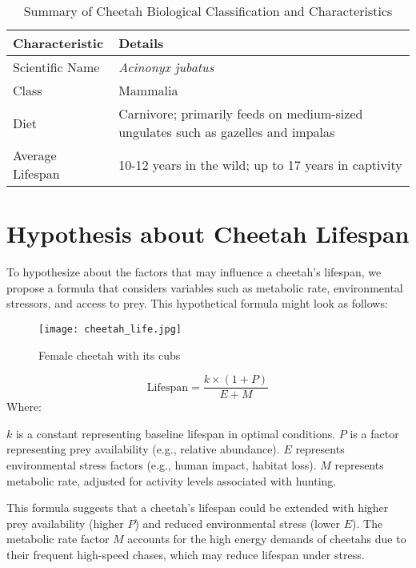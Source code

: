 \documentclass{article}
\begin{document}
\begin{table}[H]
    \centering
    \begin{tabular}{|l|l|}
        \hline
         \textbf{Characteristic} & \textbf{Details} \\
         \hline
         Scientific Name & \textit{Acinonyx jubatus} \\
         \hline
         Class & Mammalia \\
         \hline
         Diet & Carnivore; primarily feeds on medium-sized ungulates such as gazelles and impalas \\
         \hline
         Average Lifespan & 10-12 years in the wild; up to 17 years in captivity \\
         \hline
    \end{tabular}
    \caption{Summary of Cheetah Biological Classification and Characteristics}
\end{table}

\section{Hypothesis about Cheetah Lifespan}
To hypothesize about the factors that may influence a cheetah's lifespan, we propose a formula that considers variables such as metabolic rate, environmental stressors, and access to prey. This hypothetical formula might look as follows:

\begin{figure}[H]
    \centering
    \texttt{[image: cheetah\_life.jpg]}
    \caption{Female cheetah with its cubs}
\end{figure}

\begin{equation}
    \text{Lifespan} = \frac{k \times (1+P)}{E+M}
\end{equation}
Where:

\(k\) is a constant representing baseline lifespan in optimal conditions.  
\(P\) is a factor representing prey availability (e.g., relative abundance).  
\(E\) represents environmental stress factors (e.g., human impact, habitat loss).  
\(M\) represents metabolic rate, adjusted for activity levels associated with hunting.

This formula suggests that a cheetah’s lifespan could be extended with higher prey availability (higher \(P\)) and reduced environmental stress (lower \(E\)). The metabolic rate factor \(M\) accounts for the high energy demands of cheetahs due to their frequent high-speed chases, which may reduce lifespan under stress.
\end{document}
